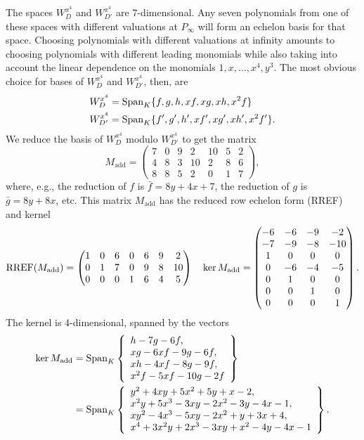 The spaces $W_D^{x^4}$ and $W_{D'}^{x^4}$ are 7-dimensional.
Any seven polynomials from one of these spaces with different valuations at $P_{\infty}$
will form an echelon basis for that space.
Choosing polynomials with different valuations at infinity amounts to choosing polynomials with different leading monomials while also taking into account the linear dependence on the monomials
$1, x, \ldots, x^4, y^3$.
The most obvious choice for bases of $W_D^{x^4}$ and $W_{D'}^{x^4}$, then, are
\begin{align*}
  W_D^{x^4} &= \operatorname{Span}_K\{ f, g, h, xf, xg, xh, x^2f \} \\
  W_{D'}^{x^4} &= \operatorname{Span}_K\{ f', g', h', xf', xg', xh', x^2f' \}.
\end{align*}
We reduce the basis of $W_D^{x^4}$ modulo $W_{D'}^{x^4}$ to get the matrix
\[ M_{\text{add}} = \begin{pmatrix}
  7 & 0 & 9 & 2 & 10 & 5 & 2 \\
  4 & 8 & 3 & 10 & 2 & 8 & 6 \\
  8 & 8 & 5 & 2 & 0 & 1 & 7
\end{pmatrix}, \]
where, e.g., the reduction of $f$ is $\bar f = 8y + 4x + 7$,
the reduction of $g$ is $\bar g = 8y + 8x$, etc.
This matrix $M_{\text{add}}$ has the reduced row echelon form (RREF)
and kernel
\[ \operatorname{RREF}(M_{\text{add}}) = \begin{pmatrix}
  1 & 0 & 6 & 0 & 6 & 9 & 2 \\
  0 & 1 & 7 & 0 & 9 & 8 & 10 \\
  0 & 0 & 0 & 1 & 6 & 4 & 5
\end{pmatrix} ~~~ \ker M_{\text{add}} =
\begin{pmatrix}
  -6 & -6 & -9 & -2 \\
  -7 & -9 & -8 & -10 \\
   1 &  0 &  0 &  0 \\
   0 & -6 & -4 & -5 \\
   0 &  1 &  0 &  0 \\
   0 &  0 &  1 &  0 \\
   0 &  0 &  0 &  1
\end{pmatrix}. \]
The kernel is 4-dimensional, spanned by the vectors
\begin{align*}
  \ker M_{\text{add}}
    &= \operatorname{Span}_K \left\{ \begin{array}{l}
               h -  7g - 6f, \\
        xg - 6xf -  9g - 6f, \\
        xh - 4xf -  8g - 9f, \\
      x^2f - 5xf - 10g - 2f \end{array} \right\} \\
    &= \operatorname{Span}_K \left\{ \begin{array}{l}
      y^2 + 4xy + 5x^2 + 5y + x - 2, \\
      x^2y + 5x^3 - 3xy - 2x^2 - 3y - 4x - 1, \\
      xy^2 - 4x^3 - 5xy - 2x^2 + y + 3x + 4, \\
      x^4 + 3x^2y + 2x^3 - 3xy + x^2 - 4y - 4x - 1
    \end{array} \right\}.
\end{align*}
